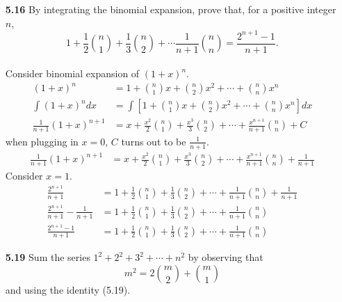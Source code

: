 \documentclass[12pt]{article}
\begin{document}


\begin{enumerate}
    \item[\bf 5.16] By integrating the binomial expansion, prove that, for a positive integer $n$,
    $$1+\frac{1}{2}\binom{n}{1} + \frac{1}{3}\binom{n}{2}+\dotsb\frac{1}{n+1}\binom{n}{n}=\frac{2^{n+1}-1}{n+1}.$$\\
    
    Consider binomial expansion of $(1+x)^n$.
    \begin{align*}
        (1+x)^n &= 1+\binom{n}{1}x + \binom{n}{2}x^2 + \dotsb + \binom{n}{n}x^n\\
        \int (1+x)^n dx &= \int\left[1+\binom{n}{1}x + \binom{n}{2}x^2 + \dotsb + \binom{n}{n}x^n\right]dx\\
        \frac{1}{n+1}(1+x)^{n+1} &= x + \frac{x^2}{2}\binom{n}{1}+\frac{x^3}{3}\binom{n}{2}+\dotsb+\frac{x^{n+1}}{n+1}\binom{n}{n}+C
    \end{align*}
    when plugging in $x=0$, $C$ turns out to be $\frac{1}{n+1}$.
    \begin{align*}
        \frac{1}{n+1}(1+x)^{n+1} &= x + \frac{x^2}{2}\binom{n}{1}+\frac{x^3}{3}\binom{n}{2}+\dotsb+\frac{x^{n+1}}{n+1}\binom{n}{n}+\frac{1}{n+1}
    \end{align*}
    Consider $x=1$.
    \begin{align*}
        \frac{2^{n+1}}{n+1} &= 1 + \frac{1}{2}\binom{n}{1} + \frac{1}{3}\binom{n}{2} + \dotsb + \frac{1}{n+1}\binom{n}{n} +\frac{1}{n+1}\\
        \frac{2^{n+1}}{n+1}-\frac{1}{n+1} &= 1 + \frac{1}{2}\binom{n}{1} + \frac{1}{3}\binom{n}{2} + \dotsb + \frac{1}{n+1}\binom{n}{n}\\
        \frac{2^{n+1}-1}{n+1} &= 1 + \frac{1}{2}\binom{n}{1} + \frac{1}{3}\binom{n}{2} + \dotsb + \frac{1}{n+1}\binom{n}{n}
    \end{align*}
    
    \newpage
    \item[\bf 5.19] Sum the series $1^2+2^2+3^2+\dotsb+n^2$ by observing that
    $$m^2=2\binom{m}{2}+\binom{m}{1}$$
    and using the identity (5.19).\\
    

\end{enumerate}
\end{document}
